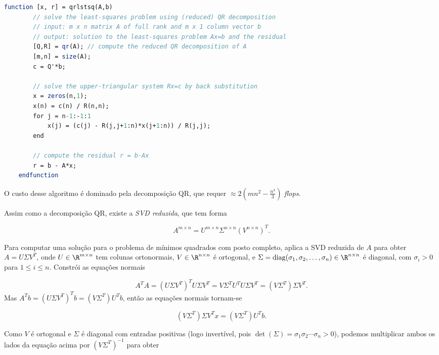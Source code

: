 \documentclass{article}
\DeclareMathOperator{\diag}{diag}
\begin{document}
\begin{lstlisting}[language=Scilab, caption=Resolvendo o problema de mínimos quadrados usando a decomposição QR]
    function [x, r] = qrlstsq(A,b)
        // solve the least-squares problem using (reduced) QR decomposition
        // input: m x n matrix A of full rank and m x 1 column vector b
        // output: solution to the least-squares problem Ax=b and the residual
        [Q,R] = qr(A); // compute the reduced QR decomposition of A
        [m,n] = size(A);
        c = Q'*b;
        
        // solve the upper-triangular system Rx=c by back substitution
        x = zeros(n,1);
        x(n) = c(n) / R(n,n);
        for j = n-1:-1:1
            x(j) = (c(j) - R(j,j+1:n)*x(j+1:n)) / R(j,j);
        end
        
        // compute the residual r = b-Ax
        r = b - A*x;
    endfunction
\end{lstlisting}

O custo desse algoritmo é dominado pela decomposição QR, que requer \(\approx 2\left(mn^2 - \frac{n^3}{3}\right)\) \emph{flops}.

Assim como a decomposição QR, existe a \emph{SVD reduzida}, que tem forma

\begin{equation}
    A^{m \times n} = U^{m \times n} \Sigma^{n \times n} (V^{n \times n})^T.
\end{equation}

Para computar uma solução para o problema de mínimos quadrados com posto completo, aplica a SVD reduzida de \(A\) para obter \(A = U \Sigma V^T\), onde \(U \in \R^{m \times n}\) tem colunas ortonormais, \(V \in \R^{n \times n}\) é ortogonal, e \(\Sigma = \diag(\sigma_1, \sigma_2, \ldots, \sigma_n) \in \R^{n \times n}\) é diagonal, com \(\sigma_i > 0\) para \(1 \leq i \leq n\). Constrói as equações normais

\[
    A^TA = (U \Sigma V^T)^T U \Sigma V^T = V \Sigma^T U^T U \Sigma V^T = (V \Sigma^T) \Sigma V^T.
\] Mas \(A^Tb = (U \Sigma V^T)^T b = (V \Sigma^T) U^T b\), então as equações normais tornam-se

\begin{equation}
    (V \Sigma^T) \Sigma V^T x = (V \Sigma^T) U^T b.
\end{equation}

Como \(V\) é ortogonal e \(\Sigma\) é diagonal com entradas positivas (logo invertível, pois \(\det(\Sigma) = \sigma_1 \sigma_2 \cdots \sigma_n > 0\)), podemos multiplicar ambos os lados da equação acima por \((V \Sigma^T)^{-1}\) para obter
\end{document}
